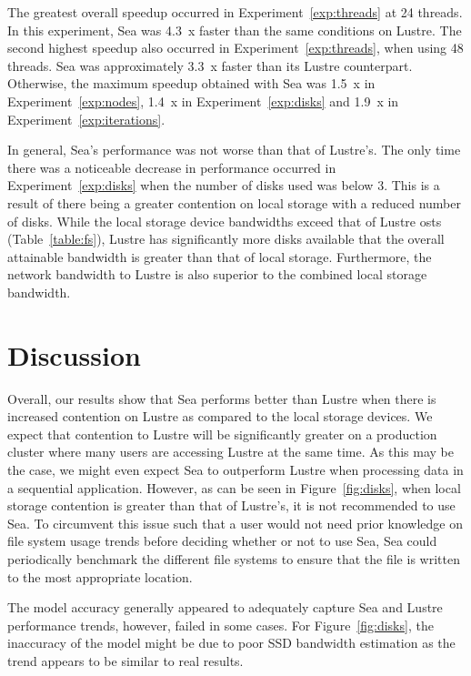 \documentclass{report}
\begin{document}
    The greatest overall speedup occurred in Experiment~\ref{exp:threads} at 24 threads. In 
    this experiment, Sea was 4.3~x faster than the same conditions on Lustre.
    The second highest speedup also occurred in Experiment~\ref{exp:threads}, when using 48
    threads. Sea was approximately 3.3~x faster than its Lustre counterpart.
    Otherwise, the maximum speedup obtained with Sea was 1.5~x in Experiment~\ref{exp:nodes},
    1.4~x in Experiment~\ref{exp:disks} and 1.9~x in Experiment~\ref{exp:iterations}.

    In general, Sea's performance was not worse than that of Lustre's. The only
    time there was a noticeable decrease in performance occurred in Experiment~\ref{exp:disks}
    when the number of disks used was below 3. This is a result of there being
    a greater contention on local storage with a reduced number of disks. While
    the local storage device bandwidths exceed that of Lustre \gls{ost}s (Table~\ref{table:fs}), Lustre has significantly more disks available that the overall
    attainable bandwidth is greater than that of local storage. Furthermore, 
    the network bandwidth to Lustre is also superior to the combined local
    storage bandwidth.

    \section{Discussion}\label{discussion}

    Overall, our results show that Sea performs better than Lustre when there is
    increased contention on Lustre as compared to the local storage devices. We
    expect that contention to Lustre will be significantly greater on a 
    production cluster where many users are accessing Lustre at the same time.
    As this may be the case, we might even expect Sea to outperform Lustre when
    processing data in a sequential application. However, as can be seen in
    Figure~\ref{fig:disks}, when local storage contention is greater than that
    of Lustre's, it is not recommended to use Sea. To circumvent this issue
    such that a user would not need prior knowledge on file system usage trends
    before deciding whether or not to use Sea, Sea could periodically benchmark
    the different file systems to ensure that the file is written to the most
    appropriate location.

    The model accuracy generally appeared to adequately capture Sea and Lustre
    performance trends, however, failed in some cases.
    For Figure~\ref{fig:disks}, the inaccuracy of the model might be due to poor
    SSD bandwidth estimation as the trend appears to be similar to real results.
    
\end{document}
